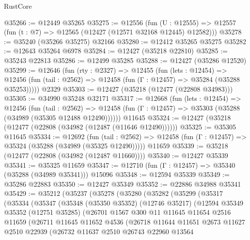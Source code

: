 \begin{lexlean}{RustCore}
\begin{coremodule}
@35266 := @12449 @35265
@35275 := @12556
    (fun (U : @12555) => @12557 (fun (t : @7) => @12565 (@12427 (@12571 @32168 @12445) @12582)))
@35278 := @35240 (@35266 @35275) @32166
@35280 := @12412 @35265 @35275
@35282 := @12643 @35264 @6978
@35284 := @12427 (@35218 @22810)
@35285 := @35243 @22813
@35286 := @12499 @35285
@35288 := @12427 (@35286 @12520)
@35299 := @12646
    (fun (rty : @2327) =>
    @12455
      (fun (lets : @12454) =>
      @12456 (fun (tail : @2562) => @12458 (fun (Γ : @12457) => @35284 (@35288 @35253)))))
    @2329
@35303 := @12427 (@35218 (@12477 (@22808 @34983)))
@35305 := @34990 @35248 @32171
@35317 := @12668
    (fun (lets : @12454) =>
    @12456
      (fun (tail : @2562) =>
      @12458 (fun (Γ : @12457) => @35303 (@35288 (@34989 (@35305 @12488 @12490))))))
    @11645
@35324 := @12427 (@35218 (@12477 (@22808 (@34982 (@12487 (@11646 @12490))))))
@35325 := @35305 @11645
@35334 := @12692
    (fun (tail : @2562) => @12458 (fun (Γ : @12457) => @35324 (@35288 (@34989 (@35325 @12490)))))
    @11659
@35339 := @35218 (@12477 (@22808 (@34982 (@12487 @11660))))
@35340 := @12427 @35339
@35341 := @35325 @11659
@35347 := @12710 (fun (Γ : @12457) => @35340 (@35288 (@34989 @35341))) @15096
@35348 := @12594 @35339
@35349 := @35286 @22883
@35350 := @12427 @35349
@35352 := @22886 @34988 @35341
@35429 := @35212
    (@35237
      (@35278
        (@35280
          (@35282
            (@35299
              (@35317
                (@35334
                  (@35347
                    (@35348
                      (@35350 @35352)
                      (@12746 @35217)
                      (@12594
                        @35349
                        @35352
                        (@12751 @35285)
                        (@26701
                          @1567
                          @300
                          @11
                          @11645
                          @11654
                          @2516
                          @11659
                          (@26711
                            @11645
                            @11652
                            @4536
                            (@26718
                              @11644
                              @11651
                              @2673
                              @11627
                              @2510
                              @22939
                              (@26732
                                @11637
                                @2510
                                @26743
                                @22960
                                @13564

\end{coremodule}
\end{lexlean}
